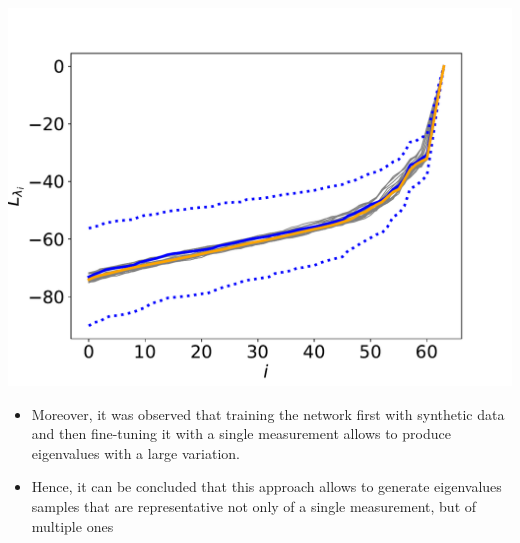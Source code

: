 \documentclass[12pt,pdftex,16x10]{elpres} %
\begin{document}
\begin{psli}
  \begin{minipage}[b][0.7\textheight][t]{0.5\textwidth}
    \centering
    \includegraphics[width=1.2\textwidth]{figs/outliers_evals_dB_wgangp.pdf}
  \end{minipage}
  \begin{minipage}[b][0.7\textheight][t]{0.5\textwidth}
    \begin{itemize}
        \item Moreover, it was observed that training the network first with synthetic data and then fine-tuning it with a single measurement allows to produce eigenvalues with a large variation.
        \item Hence, it can be concluded that this approach allows to generate eigenvalues samples that are representative not only of a single measurement, but of multiple ones
    \end{itemize}
  \end{minipage}
\end{psli}
\end{document}
